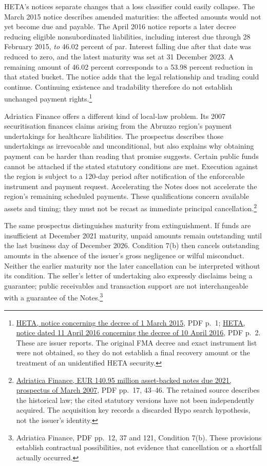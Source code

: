 HETA's notices separate changes that a loss classifier could easily collapse.
The March 2015 notice describes amended maturities: the affected amounts
would not yet become due and payable. The April 2016 notice reports a later
decree reducing eligible nonsubordinated liabilities, including interest
due through 28 February 2015, \emph{to} 46.02 percent of par. Interest falling
due after that date was reduced to zero, and the latest maturity was set at
31 December 2023. A remaining amount of 46.02 percent corresponds to a
53.98 percent reduction in that stated bucket. The notice adds that the
legal relationship and trading could continue. Continuing existence and
tradability therefore do not establish unchanged payment rights.\footnote{
\href{../prospectus/corner-cases-2026-10-04/sources/jur-more-heta-2356087/source.pdf}
{HETA, notice concerning the decree of 1 March 2015}, PDF p.~1;
\href{../prospectus/corner-cases-2026-10-04/sources/jur-more-heta-2789331/source.pdf}
{HETA, notice dated 11 April 2016 concerning the decree of 10 April 2016},
PDF p.~2. These are issuer reports. The original FMA decree and exact
instrument list were not obtained, so they do not establish a final recovery
amount or the treatment of an unidentified HETA security.}

Adriatica Finance offers a different kind of local-law problem. Its 2007
securitisation finances claims arising from the Abruzzo region's payment
undertakings for healthcare liabilities. The prospectus describes those
undertakings as irrevocable and unconditional, but also explains why
obtaining payment can be harder than reading that promise suggests.
Certain public funds cannot be attached if the stated statutory conditions
are met. Execution against the region is subject to a 120-day period after
notification of the enforceable instrument and payment request.
Accelerating the Notes does not accelerate the region's remaining scheduled
payments. These qualifications concern available assets and timing; they
must not be recast as immediate principal cancellation.\footnote{
\href{../prospectus/corner-cases-2026-10-04/sources/jur-more-hypo-843665/source.pdf}
{Adriatica Finance, EUR 140.95 million asset-backed notes due 2021,
prospectus of March 2007}, PDF pp.~17, 43--46.
The retained source describes the historical law; the cited statutory
versions have not been independently acquired. The acquisition key records
a discarded Hypo search hypothesis, not the issuer's identity.}

The same prospectus distinguishes maturity from extinguishment. If funds
are insufficient at December 2021 maturity, unpaid amounts remain outstanding
until the last business day of December 2026. Condition 7(b) then cancels
outstanding amounts in the absence of the issuer's gross negligence or
wilful misconduct. Neither the earlier maturity nor the later cancellation
can be interpreted without its condition. The seller's letter of undertaking
also expressly disclaims being a guarantee; public receivables and transaction
support are not interchangeable with a guarantee of the Notes.\footnote{
Adriatica Finance, PDF pp.~12, 37 and 121, Condition 7(b). These provisions
establish contractual possibilities, not evidence that cancellation or a
shortfall actually occurred.}

